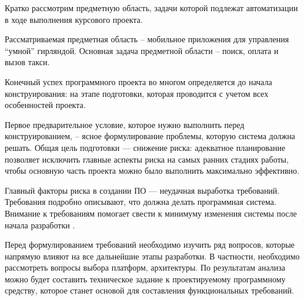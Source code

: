 \label{sec:analysis}

Кратко рассмотрим предметную область, задачи которой подлежат автоматизации в ходе выполнения курсового проекта.

Рассматриваемая предметная область – мобильное приложения для управления ``умной'' гирляндой. Основная задача предметной области – поиск, оплата и вызов такси.

Конечный успех программного проекта во многом определяется до начала конструирования: на этапе подготовки, которая проводится с учетом всех особенностей проекта.

Первое предварительное условие, которое нужно выполнить перед конструированием, -- ясное формулирование проблемы, которую система должна решать. Общая цель подготовки — снижение риска: адекватное планирование позволяет исключить главные аспекты риска на самых ранних стадиях работы, чтобы основную часть проекта можно было выполнить максимально эффективно. 

Главный факторы риска в создании ПО — неудачная выработка требований. Требования подробно описывают, что должна делать программная система. Внимание к требованиям помогает свести к минимуму изменения системы после начала разработки \cite{code_complete}.

Перед формулированием требований необходимо изучить ряд вопросов, которые напрямую влияют на все дальнейшие этапы разработки. В частности, необходимо рассмотреть вопросы выбора платформ, архитектуры. По результатам анализа можно будет составить техническое задание к проектируемому программному средству, которое станет основой для составления функциональных требований.

%

%

%
